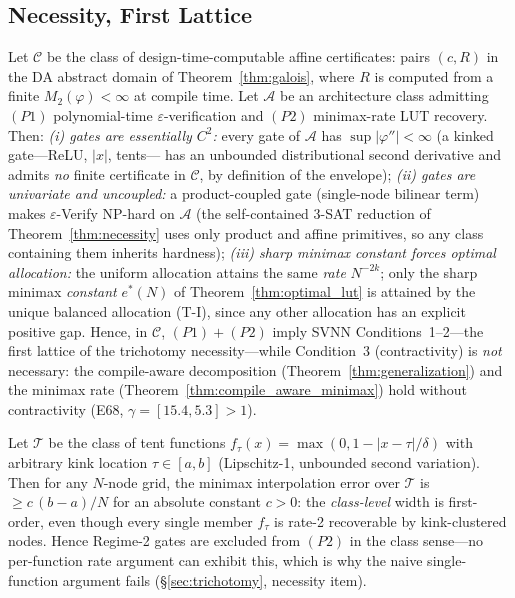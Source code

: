 \vspace{4pt}
\subsection{Necessity, First Lattice}
\label{sec:necessity-first}

\setcounter{theorem}{15}
\begin{theorem}
\label{thm:necessity_first}
Let $\mathcal{C}$ be the class of design-time-computable affine
certificates: pairs $(c, R)$ in the DA abstract domain of
Theorem~\ref{thm:galois}, where $R$ is computed from a finite
$M_2(\varphi) < \infty$ at compile time. Let $\mathcal{A}$ be an
architecture class admitting $(P1)$ polynomial-time
$\varepsilon$-verification and $(P2)$ minimax-rate LUT recovery.
Then:
\emph{(i) gates are essentially $C^2$:} every gate of $\mathcal{A}$
has $\sup|\varphi''| < \infty$ (a kinked gate---ReLU, $|x|$, tents---
has an unbounded distributional second derivative and admits \emph{no}
finite certificate in $\mathcal{C}$, by definition of the envelope);
\emph{(ii) gates are univariate and uncoupled:} a product-coupled gate
(single-node bilinear term) makes $\varepsilon$-Verify NP-hard on
$\mathcal{A}$ (the self-contained 3-SAT reduction of
Theorem~\ref{thm:necessity} uses only product and affine primitives, so
any class containing them inherits hardness);
\emph{(iii) sharp minimax \emph{constant} forces optimal allocation:}
the uniform allocation attains the same \emph{rate} $N^{-2k}$; only
the sharp minimax \emph{constant} $e^{*}(N)$ of
Theorem~\ref{thm:optimal_lut} is attained by the unique balanced
allocation (T-I), since any other allocation has an explicit positive
gap.
Hence, in $\mathcal{C}$, $(P1)+(P2)$ imply SVNN Conditions~1--2---the
first lattice of the trichotomy necessity---while Condition~3
(contractivity) is \emph{not} necessary: the compile-aware
decomposition (Theorem~\ref{thm:generalization}) and the minimax rate
(Theorem~\ref{thm:compile_aware_minimax}) hold without contractivity
(E68, $\gamma = [15.4, 5.3] > 1$).
\end{theorem}

\vspace{2pt}
\begin{lemma}
\label{lem:kink_class_width}
Let $\mathcal{T}$ be the class of tent functions
$f_\tau(x) = \max(0, 1 - |x - \tau|/\delta)$ with arbitrary kink
location $\tau \in [a,b]$ (Lipschitz-1, unbounded second variation).
Then for any $N$-node grid, the minimax interpolation error over
$\mathcal{T}$ is $\geq c\,(b-a)/N$ for an absolute constant $c > 0$:
the \emph{class-level} width is first-order, even though every single
member $f_\tau$ is rate-2 recoverable by kink-clustered nodes. Hence
Regime-2 gates are excluded from $(P2)$ in the class sense---no
per-function rate argument can exhibit this, which is why the naive
single-function argument fails ({\S}\ref{sec:trichotomy},
necessity item).
\end{lemma}

